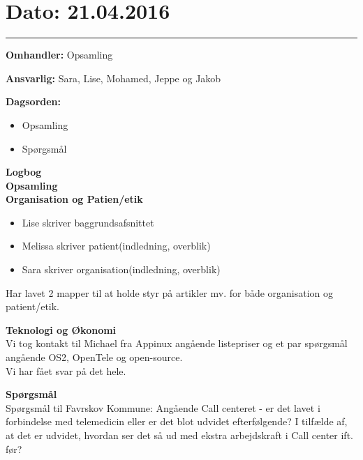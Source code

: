 \section{Dato: 21.04.2016}
\hrule

\textbf{Omhandler:} Opsamling

\textbf{Ansvarlig:} Sara, Lise, Mohamed, Jeppe og Jakob

\textbf{Dagsorden:}
\begin{itemize}
	\item Opsamling
	\item Spørgsmål
\end{itemize}

\textbf{Logbog}
\\

\textbf{Opsamling}
\\
\textbf{Organisation og Patien/etik}
\\
\begin{itemize}
	\item Lise skriver baggrundsafsnittet
	\item Melissa skriver patient(indledning, overblik)
	\item Sara skriver organisation(indledning, overblik)
\end{itemize}
Har lavet 2 mapper til at holde styr på artikler mv. for både organisation og patient/etik.

\textbf{Teknologi og Økonomi}
\\
Vi tog kontakt til Michael fra Appinux angående listepriser og et par spørgsmål angående OS2, OpenTele og open-source.\\
Vi har fået svar på det hele. 

\textbf{Spørgsmål}
\\
Spørgsmål til Favrskov Kommune: Angående Call centeret - er det lavet i forbindelse med telemedicin eller er det blot udvidet efterfølgende? I tilfælde af, at det er udvidet, hvordan ser det så ud med ekstra arbejdskraft i Call center ift. før?